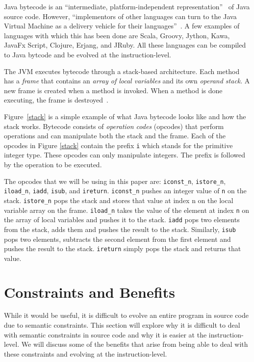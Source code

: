 \documentclass{sig-alternate}
\begin{document}
Java bytecode is an ``intermediate, platform-independent representation''~\cite{FINCH2:2009} of Java source code. However, ``implementors of other languages can turn to the Java Virtual Machine as a delivery vehicle for their languages''~\cite{JVMspec:2013}. A few examples of languages with which this has been done are Scala, Groovy, Jython, Kawa, JavaFx Script, Clojure, Erjang, and JRuby. All these languages can be compiled to Java bytcode and be evolved at the instruction-level. \par

The JVM executes bytecode through a stack-based architecture. Each method has a \textit{frame} that contains an \textit{array of local variables} and its own \textit{operand stack}. A new frame is created when a method is invoked. When a method is done executing, the frame is destroyed~\cite{Oracle:2013}.

Figure~\ref{stack} is a simple example of what Java bytecode looks like and how the stack works. Bytecode consists of \textit{operation codes} (opcodes) that perform operations and can manipulate both the stack and the frame. Each of the opcodes in Figure \ref{stack} contain the prefix \texttt{i} which stands for the primitive integer type. These opcodes can only manipulate integers. The prefix is followed by the operation to be executed.\par 

The opcodes that we will be using in this paper are: \texttt{iconst\_n}, \texttt{istore\_n}, \texttt{iload\_n}, \texttt{iadd}, \texttt{isub}, and \texttt{ireturn}. \texttt{iconst\_n} pushes an integer value of \texttt{n} on the stack. \texttt{istore\_n} pops the stack and stores that value at index n on the local variable array on the frame. \texttt{iload\_n} takes the value of the element at index \texttt{n} on the array of local variables and pushes it to the stack. \texttt{iadd} pops two elements from the stack, adds them and pushes the result to the stack. Similarly, \texttt{isub} pops two elements, subtracts the second element from the first element and pushes the result to the stack. \texttt{ireturn} simply pops the stack and returns that value.


\section{Constraints and Benefits}

While it would be useful, it is difficult to evolve an entire program in source code due to semantic constraints. This section will explore why it is difficult to deal with semantic constraints in source code and why it is easier at the instruction-level. We will discuss some of the benefits that arise from being able to deal with these constraints and evolving at the instruction-level.
\end{document}
